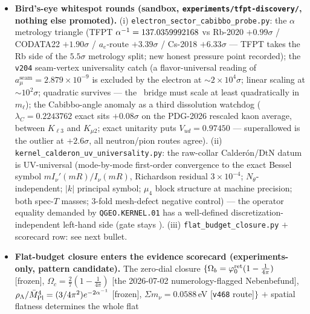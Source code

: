 \begin{itemize}[leftmargin=1.5em]
$7/7$ checks; suite green through \texttt{v472} (466 modules); numerical (dense eigh $+$ FHS twist grid),
Python-only by nature. Papers updated: \texttt{tfpt\_1} (sixth honest step in the EM closure),
\texttt{tfpt\_research\_contracts} (residual certification), \texttt{tfpt\_safeguards} ($\alpha$-form
lever), root \texttt{README}, \texttt{zenodo\_description.html}. Exploration original:
\texttt{experiments/tfpt-discovery/quillen\_detline\_twist\_moduli.py} (same day).
\item \textbf{Bird's-eye whitespot rounds (sandbox, \texttt{experiments/tfpt-discovery/}, nothing else
promoted).} (i) \texttt{electron\_sector\_cabibbo\_probe.py}: the $\alpha$ metrology triangle (TFPT
$\alpha^{-1}=137.0359992168$ vs Rb-2020 $+0.99\sigma$ / CODATA22 $+1.90\sigma$ / $a_e$-route $+3.39\sigma$ /
Cs-2018 $+6.33\sigma$ --- TFPT takes the Rb side of the $5.5\sigma$ metrology split; new honest pressure
point recorded); the \texttt{v204} seam-vertex universality catch (a flavor-universal reading of
$a_\mu^{\mathrm{seam}}=2.879\times10^{-9}$ is excluded by the electron at ${\sim}2\times10^4\sigma$; linear
scaling at ${\sim}10^2\sigma$; quadratic survives --- the \mC\ bridge must scale at least quadratically in
$m_\ell$); the Cabibbo-angle anomaly as a third dissolution watchdog ($\lambda_C=0.2243762$ exact sits
$+0.08\sigma$ on the PDG-2026 rescaled kaon average, between $K_{\ell3}$ and $K_{\mu2}$; exact unitarity
puts $V_{ud}=0.97450$ --- superallowed is the outlier at $+2.6\sigma$, all neutron/pion routes agree).
(ii) \texttt{kernel\_calderon\_uv\_universality.py}: the raw-collar Calder\'on/DtN datum is UV-universal
(mode-by-mode first-order convergence to the exact Bessel symbol $m I_\nu'(mR)/I_\nu(mR)$, Richardson
residual $3\times10^{-4}$; $N_\theta$-independent; $|k|$ principal symbol; $\mu_4$ block structure at
machine precision; both spec-$T$ masses; $3$-fold mesh-defect negative control) --- the operator equality
demanded by \texttt{QGEO.KERNEL.01} has a well-defined discretization-independent left-hand side (gate
stays \mO). (iii) \texttt{flat\_budget\_closure.py} $+$ scorecard row: see next bullet.
\item \textbf{Flat-budget closure enters the evidence scorecard (experiments-only, pattern candidate).}
The zero-dial closure $\{\Omega_b=\varphi_0^{\mathrm{ret}}(1-\tfrac{1}{4\pi})$ [frozen], $\Omega_c=\tfrac27(1-\tfrac{1}{4\pi})$
[the 2026-07-02 numerology-flagged Nebenbefund], $\rho_\Lambda/\bar M_{\mathrm{Pl}}^4=(3/4\pi^2)e^{-2\alpha^{-1}}$ [frozen],
$\Sigma m_\nu=0.0588$\,eV [\texttt{v468} route]$\}$ $+$ spatial flatness determines the whole flat

\end{itemize}

